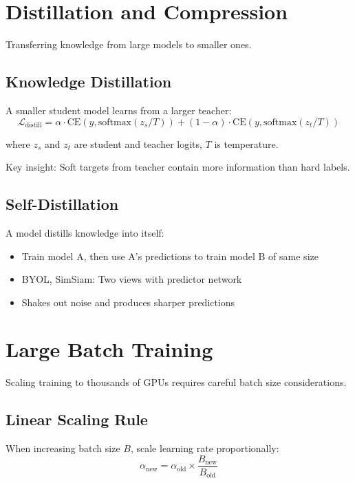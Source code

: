 \section{Distillation and Compression}

Transferring knowledge from large models to smaller ones.

\subsection{Knowledge Distillation}

A smaller student model learns from a larger teacher:
\begin{equation}
\mathcal{L}_{\text{distill}} = \alpha \cdot \text{CE}(y, \text{softmax}(z_s/T)) + (1-\alpha) \cdot \text{CE}(y, \text{softmax}(z_t/T))
\end{equation}

where $z_s$ and $z_t$ are student and teacher logits, $T$ is temperature.

Key insight: Soft targets from teacher contain more information than hard labels.

\subsection{Self-Distillation}

A model distills knowledge into itself:
\begin{itemize}
    \item Train model A, then use A's predictions to train model B of same size
    \item BYOL, SimSiam: Two views with predictor network
    \item Shakes out noise and produces sharper predictions
\end{itemize}

\section{Large Batch Training}

Scaling training to thousands of GPUs requires careful batch size considerations.

\subsection{Linear Scaling Rule}

When increasing batch size $B$, scale learning rate proportionally:
\begin{equation}
\alpha_{\text{new}} = \alpha_{\text{old}} \times \frac{B_{\text{new}}}{B_{\text{old}}}
\end{equation}

